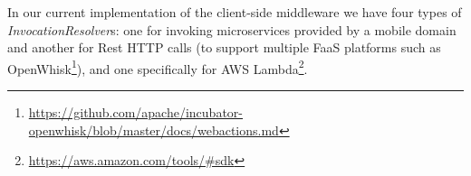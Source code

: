 In our current implementation of the client-side middleware we have four types of \textit{InvocationResolver}s: one for invoking microservices provided by a mobile domain and another for Rest HTTP calls (to support multiple FaaS platforms such as OpenWhisk\footnote{\url{https://github.com/apache/incubator-openwhisk/blob/master/docs/webactions.md}}), and one specifically for AWS Lambda\footnote{\url{https://aws.amazon.com/tools/\#sdk}}. %




